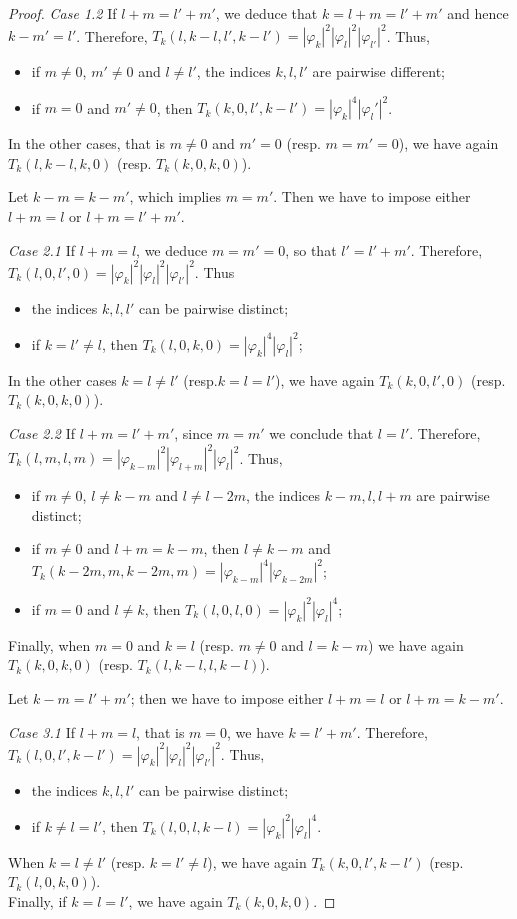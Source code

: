 \documentclass[11pt,leqno]{amsart}
\begin{document}
\begin{proof}
{\it Case 1.2}\;   If $l+m=l'+m'$, we deduce that $k=l+m=l'+m'$ and hence $k-m'=l'$. Therefore, $T_k(l,k-l,l',k-l')= |\varphi_k|^2 |\varphi_l|^2 |\varphi_{l'}|^2$. Thus, 
\begin{itemize}
\item if $m\neq 0$, $m'\neq 0$ and $l\neq l'$, the indices $k,l,l'$ are pairwise different; 
\item if $m=0$ and $m'\neq 0$, then $T_k(k,0,l',k-l')=  |\varphi_k|^4 |\varphi_l'|^2 $.
\end{itemize} 
In the other cases, that is $m\neq 0$ and $m'=0$ (resp. $m=m'=0$), we have again $T_k(l,k-l,k,0)$ (resp. $T_k(k,0,k,0)$).
\bigskip




 \; Let $k-m=k-m'$, which implies $m=m'$.  Then we have to impose either $l+m=l$ or $l+m=l'+m'$. 

{\it Case 2.1} \;  If $l+m=l$, we deduce $m=m'=0$, so that $l'=l'+m'$. Therefore, $T_k(l,0, l',0)=|\varphi_k|^2 |\varphi_l|^2 |\varphi_{l'}|^2$.  Thus
\begin{itemize}
\item the indices $k,l,l'$ can be pairwise distinct;
\item if $k=l'\neq l$, then $T_k(l,0,k,0)= |\varphi_k|^4 |\varphi_l|^2 $;
\end{itemize}
In the other cases $k=l\neq l'$ (resp.$ k=l=l'$), we have again $T_k(k,0,l',0)$ (resp.  $T_k(k,0,k,0)$). 

{\it Case 2.2}\;  If $l+m=l'+m'$, since $m=m'$ we conclude that $l=l'$. Therefore, $T_k(l,m,l, m)=|\varphi_{k-m}|^2 |\varphi_{l+m}|^2 |\varphi_{l}|^2$. Thus, 
\begin{itemize}
\item if  $m\neq 0$, $l\neq k-m$ and $l\neq l-2m$, the indices $k-m, l, l+m$ are pairwise distinct; 
\item if $m\neq 0$ and  $l+m=k-m$, then $l\neq k-m$ and $T_k(k-2m, m, k-2m,m)= |\varphi_{k-m}|^4 |\varphi_{k-2m}|^2$; 
\item if $m=0$ and $l\neq k$, then $T_k(l,0,l,0) = |\varphi_k|^2 |\varphi_l|^4$; 
\end{itemize}
Finally, when $m=0$ and $k=l$ (resp. $m\neq 0$ and $l=k-m$)  we have again $T_k(k,0,k,0)$ (resp. $T_k(l, k-l, l, k-l)$). 
\bigskip

 Let $k-m=l'+m'$; then we have to impose either $l+m=l$ or $l+m= k-m'$.

{\it Case 3.1}\;  If $l+m=l$, that is $m=0$, we have $k=l'+m'$. Therefore, $T_k(l,0,l',k-l')=|\varphi_k|^2 |\varphi_l|^2 |\varphi_{l'}|^2$. Thus,
\begin{itemize}
\item the indices $k,l,l'$ can be pairwise distinct;
\item if $k\neq l=l'$, then $T_k(l,0,l,k-l)= |\varphi_k|^2 |\varphi_l|^4$.
\end{itemize}
When $k=l\neq l'$ (resp. $k=l'\neq l$), we have again $T_k(k,0,l',k-l')$ (resp. $T_k(l,0,k,0)$).\\
 Finally, if $k=l=l'$, we have again $T_k(k,0,k,0)$. 


\end{proof}
\end{document}
